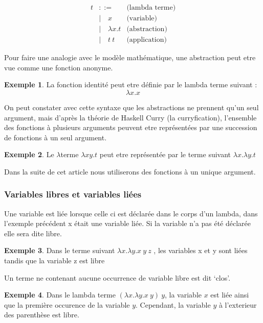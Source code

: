 \documentclass {article}
\theoremstyle{definition}
\newtheorem{example}{Exemple}
\theoremstyle{remark}
\begin{document}
\begin{align*}
  t &::= & \mbox{(lambda terme)} \\
  &|\quad x & \mbox{(variable)} \\
  &|\quad \lambda x. t & \mbox{(abstraction)} \\
  &|\quad t\: t          & \mbox{(application)}
\end{align*}

Pour faire une analogie avec le modèle mathématique, une abstraction peut 
etre vue comme une fonction anonyme.
 
\begin{example}
 La fonction identité peut etre définie par le lambda terme suivant :
  \[ 
  \lambda x. x
  \]
\end{example}

On peut constater avec cette syntaxe que les abstractions ne prennent qu'un
seul argument, mais d'après la théorie de Haskell Curry (la curryfication), 
l'ensemble des fonctions à plusieurs arguments peuvent etre représentées 
par une succession de fonctions à un seul argument.
\begin{example}
Le \(\lambda\)terme  \(\lambda xy.t\) peut etre représentée par le terme suivant
\(\lambda x.\lambda y.t\)   
\end{example} 
Dans la suite de cet article nous utiliserons des fonctions à un unique 
argument. 

\subsubsection{Variables libres et variables liées}

Une variable est liée lorsque celle ci est déclarée dans le corps d'un lambda, 
dans l'exemple précédent x était une variable liée. 
Si la variable n'a pas été déclarée elle sera dite libre. 

\begin{example}
  Dans le terme suivant \(\lambda x.\lambda y.x\:y\:z\) , les variables x et 
  y sont liées tandis que la variable z est libre 
\end{example}

Un terme ne contenant aucune occurrence de variable libre est dit `clos'.
\begin{example}
  Dans le lambda terme \((\lambda x. \lambda y. x\: y)\: y\), la
  variable \(x\) est liée ainsi que la première occurence de la
  variable \(y\). Cependant, la variable \(y\) à l'exterieur des
  parenthèse est libre.
\end{example}
\end{document}
